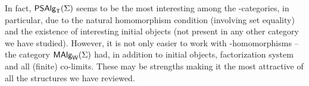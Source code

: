 \documentclass[10pt]{article}
\begin{document}
\begin{LS}
In fact, $\mbox{\sf PSAlg}_{\sf T}(\Sigma)$ seems to be the most interesting among the
\PS-categories, in particular, due to the natural homomorphism
condition (involving set equality) and the existence of
interesting initial objects (not present in any other category we have
studied). However, it is not only easier to work with
\PP-homomorphisms -- the category $\mbox{\rm\sf MAlg}_{\sf W}(\Sigma)$ had, in addition to initial
objects, factorization system and all (finite) co-limits. These may be
strengths making it the most attractive of all the structures we have
reviewed.
\end{LS}




\end{document}

